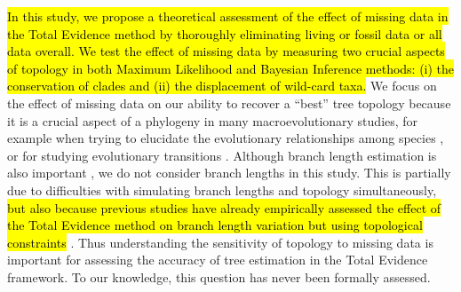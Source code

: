 \documentclass[12pt,letterpaper]{article}
\begin{document}
\hl{In this study, we propose a theoretical assessment of the effect of missing data in the Total Evidence method by thoroughly eliminating living or fossil data or all data overall.
We test the effect of missing data by measuring two crucial aspects of topology in both Maximum Likelihood and Bayesian Inference methods: (i) the conservation of clades and (ii) the displacement of wild-card taxa.}
We focus on the effect of missing data on our ability to recover a ``best'' tree topology because it is a crucial aspect of a phylogeny in many macroevolutionary studies, for example when trying to elucidate the evolutionary relationships among species \citep[e.g.][]{meredithimpacts2011,jetzthe2012}, or for studying evolutionary transitions \citep[e.g.][]{friedmanexplosive2010}.
Although branch length estimation is also important \citep[namely for timing extinction and/or speciation events; e.g.][]{ronquista2012}, we do not consider branch lengths in this study.
This is partially due to difficulties with simulating branch lengths and topology simultaneously, \hl{but also because previous studies have already empirically assessed the effect of the Total Evidence method on branch length variation but using topological constraints} \citep{ronquista2012,schragocombining2013,slaterphylogenetic2013,beckancient2014}.
Thus understanding the sensitivity of topology to missing data is important for assessing the accuracy of tree estimation in the Total Evidence framework. To our knowledge, this question has never been formally assessed.
\end{document}
